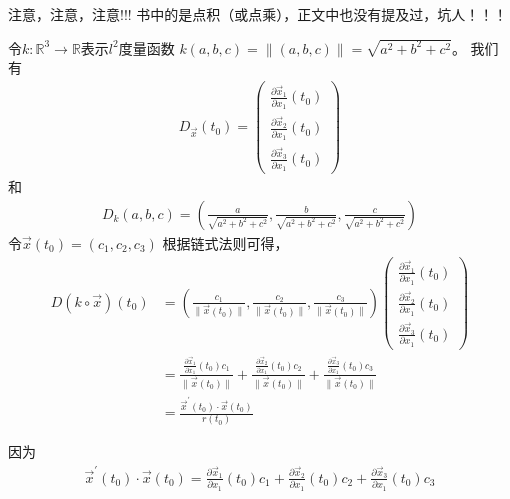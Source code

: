 \documentclass{article}
\begin{document}
注意，注意，注意!!! 书中的是点积（或点乘），正文中也没有提及过，坑人！！！

令$k: \mathbb{R}^3 \to \mathbb{R}$表示$l^2$度量函数
$k(a, b, c) = \|(a, b, c)\| = \sqrt{a^2 + b^2 + c^2}$。
我们有
\begin{align*}
  D_{\overrightarrow{x}}(t_0) =
  \begin{pmatrix}
    \frac{\partial \overrightarrow{x}_1}{\partial x_1} (t_0) \\
    \frac{\partial \overrightarrow{x}_2}{\partial x_1} (t_0) \\
    \frac{\partial \overrightarrow{x}_3}{\partial x_1} (t_0)
  \end{pmatrix}
\end{align*}
和
\begin{align*}
  D_k(a, b, c) = (\frac{a}{\sqrt{a^2 + b^2 + c^2}}, \frac{b}{\sqrt{a^2 + b^2 + c^2}}, \frac{c}{\sqrt{a^2 + b^2 + c^2}})
\end{align*}
令$\overrightarrow{x}(t_0) = (c_1, c_2, c_3)$
根据链式法则可得，
\begin{align*}
  D(k \circ \overrightarrow{x})(t_0)
   & = (\frac{c_1}{\|\overrightarrow{x}(t_0)\|}, \frac{c_2}{\|\overrightarrow{x}(t_0)\|}, \frac{c_3}{\|\overrightarrow{x}(t_0)\|})
  \begin{pmatrix}
    \frac{\partial \overrightarrow{x}_1}{\partial x_1} (t_0) \\
    \frac{\partial \overrightarrow{x}_2}{\partial x_1} (t_0) \\
    \frac{\partial \overrightarrow{x}_3}{\partial x_1} (t_0)
  \end{pmatrix}                                                                       \\
   & = \frac{\frac{\partial \overrightarrow{x}_1}{\partial x_1} (t_0) c_1 }{\|\overrightarrow{x}(t_0)\|}
  + \frac{\frac{\partial \overrightarrow{x}_2}{\partial x_1} (t_0) c_2}{\|\overrightarrow{x}(t_0)\|}
  + \frac{\frac{\partial \overrightarrow{x}_3}{\partial x_1} (t_0) c_3}{\|\overrightarrow{x}(t_0)\|}                                 \\
   & = \frac{\overrightarrow{x}^\prime(t_0) \cdot \overrightarrow{x}(t_0)}{r(t_0)}
\end{align*}

因为
\begin{align*}
  \overrightarrow{x}^\prime(t_0) \cdot \overrightarrow{x}(t_0)
  = \frac{\partial \overrightarrow{x}_1}{\partial x_1} (t_0) c_1 
  + \frac{\partial \overrightarrow{x}_2}{\partial x_1} (t_0) c_2
  + \frac{\partial \overrightarrow{x}_3}{\partial x_1} (t_0) c_3
\end{align*}
\end{document}
